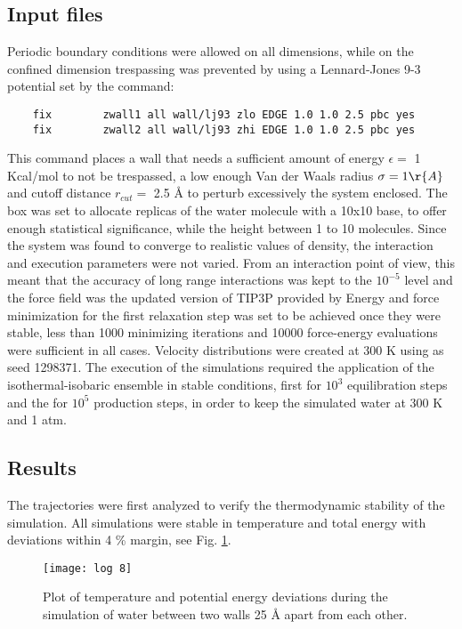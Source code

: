 \documentclass[
	12pt, %
]{fphw}
\begin{document}
\subsection{Input files}
Periodic boundary conditions were allowed on all dimensions, while on the confined dimension trespassing was prevented by using a Lennard-Jones 9-3 potential set by the command:
\begin{verbatim}	
	fix	       zwall1 all wall/lj93 zlo EDGE 1.0 1.0 2.5 pbc yes
	fix	       zwall2 all wall/lj93 zhi EDGE 1.0 1.0 2.5 pbc yes
\end{verbatim}
This command places a wall that needs a sufficient amount of energy $\epsilon =$ 1 Kcal/mol to not be trespassed, a low enough  Van der Waals radius $\sigma = 1 \r{A}$ and cutoff distance $r_{cut} =$ 2.5 \r{A} to perturb excessively the system enclosed.
The box was set to allocate replicas of the water molecule with a 10x10 base, to offer enough statistical significance, while the height between 1 to 10 molecules.
Since the system was found to converge to realistic values of density, the interaction and execution parameters were not varied.
From an interaction point of view, this meant that the accuracy of long range interactions was kept to the $10^{-5}$ level and the force field was the updated version of TIP3P provided by 
Energy and force minimization for the first relaxation step was set to be achieved once they were stable, less than 1000 minimizing iterations and 10000 force-energy evaluations were sufficient  in all cases.
Velocity distributions were created at 300 K using as seed 1298371.
The execution of the simulations required the application of the isothermal-isobaric ensemble in stable conditions, first for $10^{3}$ equilibration steps and the for $10^{5}$ production steps, in order to keep the simulated water at 300 K and 1 atm.

\subsection{Results}
The trajectories were first analyzed to verify the thermodynamic stability of the simulation. 
All simulations were stable in temperature and total energy with deviations within 4 \% margin, see Fig. \ref{log}.\\

\begin{figure}[h!]
	\centering
	\texttt{[image: log 8]}
	\caption{Plot of temperature and potential energy deviations during the simulation of water between two walls 25 \r{A} apart from each other.}
	\label{log}
\end{figure}
\end{document}
